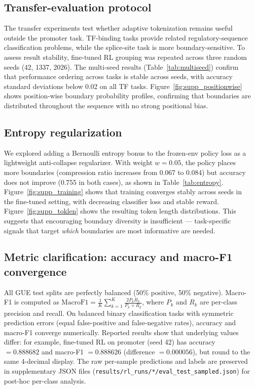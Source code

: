\documentclass[sigconf,screen]{acmart}
\begin{document}
\subsection{Transfer-evaluation protocol}
The transfer experiments test whether adaptive tokenization remains useful outside the promoter task. TF-binding tasks provide related regulatory-sequence classification problems, while the splice-site task is more boundary-sensitive. To assess result stability, fine-tuned RL grouping was repeated across three random seeds (42, 1337, 2026). The multi-seed results (Table~\ref{tab:multiseed}) confirm that performance ordering across tasks is stable across seeds, with accuracy standard deviations below 0.02 on all TF tasks. Figure~\ref{fig:supp_positionwise} shows position-wise boundary probability profiles, confirming that boundaries are distributed throughout the sequence with no strong positional bias.

\subsection{Entropy regularization}
We explored adding a Bernoulli entropy bonus to the frozen-env policy loss as a lightweight anti-collapse regularizer. With weight $w=0.05$, the policy places more boundaries (compression ratio increases from 0.067 to 0.084) but accuracy does not improve (0.755 in both cases), as shown in Table~\ref{tab:entropy}. Figure~\ref{fig:supp_training} shows that training converges stably across seeds in the fine-tuned setting, with decreasing classifier loss and stable reward. Figure~\ref{fig:supp_toklen} shows the resulting token length distributions. This suggests that encouraging boundary diversity is insufficient — task-specific signals that target \emph{which} boundaries are most informative are needed.

\subsection{Metric clarification: accuracy and macro-F1 convergence}
All GUE test splits are perfectly balanced (50\% positive, 50\% negative). Macro-F1 is computed as $\mathrm{MacroF1} = \frac{1}{K} \sum_{k=1}^{K} \frac{2 P_k R_k}{P_k + R_k}$, where $P_k$ and $R_k$ are per-class precision and recall. On balanced binary classification tasks with symmetric prediction errors (equal false-positive and false-negative rates), accuracy and macro-F1 converge numerically. Reported results show that underlying values differ: for example, fine-tuned RL on promoter (seed 42) has accuracy $= 0.888682$ and macro-F1 $= 0.888626$ (difference $= 0.000056$), but round to the same 4-decimal display. The raw per-sample predictions and labels are preserved in supplementary JSON files (\texttt{results/rl\_runs/*/eval\_test\_sampled.json}) for post-hoc per-class analysis.
\end{document}
